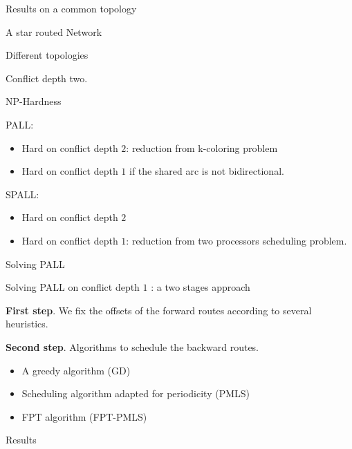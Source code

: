 \documentclass[10 pt]{beamer}
\begin{document}
\begin{section}{Results on a common topology}
\begin{subsection}{A star routed Network}
\begin{frame}{Different topologies}
\begin{multicols}{2}
 Conflict depth two.

\end{multicols}
\end{frame}

\begin{frame}{NP-Hardness}
   \begin{multicols}{2}
   PALL:
   \begin{itemize}
   \item Hard on conflict depth $2$: reduction from k-coloring problem
   \item Hard on conflict depth $1$ if the shared arc is not bidirectional.
   \end{itemize}
   
   SPALL:
   \begin{itemize}
    \item Hard on conflict depth $2$ 
       \item Hard on conflict depth $1$: reduction from two processors scheduling problem.
   \end{itemize}
   \end{multicols}

\end{frame}
\end{subsection}

\begin{subsection}{Solving PALL}
\begin{frame}{Solving PALL on conflict depth $1$ : a two stages approach}

{\bf First step}. We fix the offsets of the forward routes according to several heuristics.
\vspace{0.5cm}


{\bf Second step}. Algorithms to schedule the backward routes.
\vspace{0.5cm}
\begin{itemize}
	
	 \item A greedy algorithm (GD)
	 \item Scheduling algorithm adapted for periodicity (PMLS)
	 \item FPT algorithm (FPT-PMLS)
	\end{itemize}


\end{frame}
\end{subsection}

\begin{subsection}{Results}


\end{subsection}
\end{section}
\end{document}

